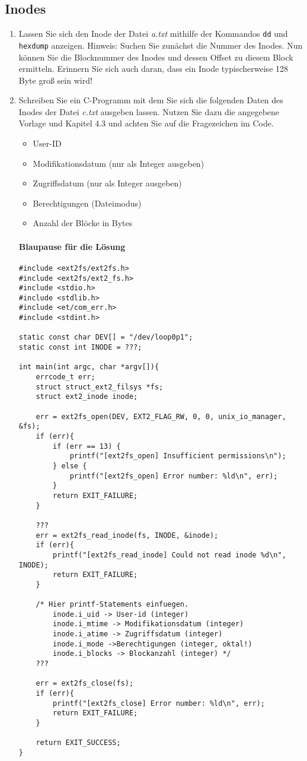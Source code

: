 \documentclass[11pt,a4paper]{article}
\def\inlinebash{\lstinline[style=bash]}
\begin{document}
\subsection{Inodes}
\begin{enumerate}
	\item Lassen Sie sich den Inode der Datei \emph{a.txt} mithilfe der Kommandos \inlinebash$dd$
		und \inlinebash$hexdump$ anzeigen. Hinweis: Suchen Sie zunächst die Nummer des Inodes.
		Nun können Sie die Blocknummer des Inodes und dessen Offset zu diesem Block ermitteln.
		Erinnern Sie sich auch daran, dass ein Inode typischerweise 128 Byte groß sein wird!
	\item Schreiben Sie ein C-Programm mit dem Sie sich die folgenden Daten
		des Inodes der Datei \emph{c.txt} ausgeben lassen. Nutzen Sie dazu die angegebene
		Vorlage und Kapitel 4.3 und achten Sie auf die Fragezeichen im Code.
		\begin{itemize}
			\item User-ID
			\item Modifikationsdatum (nur als Integer ausgeben)
			\item Zugriffsdatum (nur als Integer ausgeben)
			\item Berechtigungen (Dateimodus)
			\item Anzahl der Blöcke in Bytes
		\end{itemize}
		
		\paragraph{Blaupause für die Lösung}
		\begin{lstlisting}[style=c]
#include <ext2fs/ext2fs.h>
#include <ext2fs/ext2_fs.h>
#include <stdio.h>
#include <stdlib.h>
#include <et/com_err.h>
#include <stdint.h>

static const char DEV[] = "/dev/loop0p1";
static const int INODE = ???;

int main(int argc, char *argv[]){
	errcode_t err;
	struct struct_ext2_filsys *fs;
	struct ext2_inode inode;

	err = ext2fs_open(DEV, EXT2_FLAG_RW, 0, 0, unix_io_manager, &fs);
	if (err){
		if (err == 13) {
			printf("[ext2fs_open] Insufficient permissions\n");
		} else {
			printf("[ext2fs_open] Error number: %ld\n", err);
		}
		return EXIT_FAILURE;
	}

	???
	err = ext2fs_read_inode(fs, INODE, &inode);
	if (err){
		printf("[ext2fs_read_inode] Could not read inode %d\n", INODE);
		return EXIT_FAILURE;
	}

	/* Hier printf-Statements einfuegen. 
		inode.i_uid -> User-id (integer)
		inode.i_mtime -> Modifikationsdatum (integer)
		inode.i_atime -> Zugriffsdatum (integer)
		inode.i_mode ->Berechtigungen (integer, oktal!)
		inode.i_blocks -> Blockanzahl (integer) */
	???

	err = ext2fs_close(fs);
	if (err){
		printf("[ext2fs_close] Error number: %ld\n", err);
		return EXIT_FAILURE;
	}

	return EXIT_SUCCESS;
}

		\end{lstlisting}
\end{enumerate}
\end{document}
